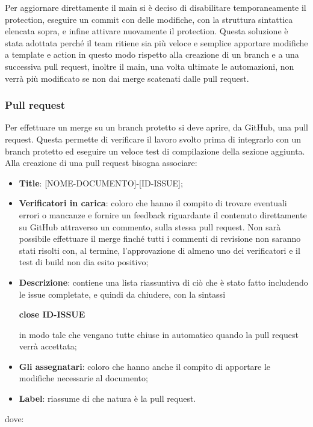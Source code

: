 Per aggiornare direttamente il main si è deciso di disabilitare temporaneamente
il protection, eseguire un commit con delle modifiche, con la struttura
sintattica elencata sopra, e infine attivare nuovamente il protection. Questa
soluzione è stata adottata perché il team ritiene sia più veloce e semplice
apportare modifiche a template e action in questo modo rispetto alla creazione
di un branch e a una successiva pull request, inoltre il main, una volta
ultimate le automazioni, non verrà più modificato se non dai merge scatenati
dalle pull request.

\subsubsection{Pull request}\label{inf:pr}
Per effettuare un merge su un branch protetto si deve aprire, da GitHub, una
pull request. Questa permette di verificare il lavoro svolto prima di
integrarlo con un branch protetto ed eseguire un veloce test di compilazione
della sezione aggiunta. Alla creazione di una pull request bisogna associare:
\begin{itemize}
      \item \textbf{Title}: [NOME-DOCUMENTO]-[ID-ISSUE];
      \item \textbf{Verificatori in carica}: coloro che hanno il compito di trovare eventuali errori o mancanze e fornire un feedback
            riguardante il contenuto direttamente su GitHub attraverso un commento, sulla stessa pull request.
            Non sarà possibile effettuare il merge finché tutti i commenti di revisione non saranno stati risolti
            con, al termine, l'approvazione di almeno uno dei verificatori e il test di build non dia esito positivo;
      \item \textbf{Descrizione}: contiene una lista riassuntiva di ciò che è stato fatto includendo le issue completate, e quindi da chiudere,
            con la sintassi
            \begin{center}
                  \textbf{close ID-ISSUE}
            \end{center}
            in modo tale che vengano tutte chiuse in automatico quando la pull request verrà accettata;
      \item \textbf{Gli assegnatari}: coloro che hanno anche il compito di apportare le modifiche necessarie al documento;
      \item \textbf{Label}: riassume di che natura è la pull request.
\end{itemize}
dove:

